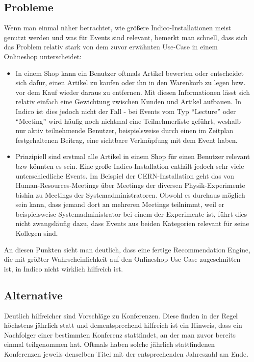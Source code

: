 \subsection{Probleme}

Wenn man einmal näher betrachtet, wie größere Indico-Installationen meist genutzt werden und was für
Events sind relevant, bemerkt man schnell, dass sich das Problem relativ stark von dem zuvor
erwähnten Use-Case in einem Onlineshop unterscheidet:

\begin{itemize}

\item In einem Shop kann ein Benutzer oftmals Artikel bewerten oder entscheidet sich dafür, einen
Artikel zu kaufen oder ihn in den Warenkorb zu legen bzw. vor dem Kauf wieder daraus zu entfernen.
Mit diesen Informationen lässt sich relativ einfach eine Gewichtung zwischen Kunden und Artikel
aufbauen. In Indico ist dies jedoch nicht der Fall - bei Events vom Typ \enquote{Lecture} oder
\enquote{Meeting} wird häufig noch nichtmal eine Teilnehmerliste geführt, weshalb nur aktiv
teilnehmende Benutzer, beispielsweise durch einen im Zeitplan festgehaltenen Beitrag, eine sichtbare
Verknüpfung mit dem Event haben.

\item Prinzipiell sind erstmal alle Artikel in einem Shop für einen Benutzer relevant bzw könnten es
sein. Eine große Indico-Installation enthält jedoch sehr viele unterschiedliche Events. Im Beispiel
der CERN-Installation geht das von Human-Resources-Meetings über Meetings der diversen
Physik-Experimente bishin zu Meetings der Systemadministratoren. Obwohl es durchaus möglich sein
kann, dass jemand dort an mehreren Meetings teilnimmt, weil er beispielsweise Systemadministrator
bei einem der Experimente ist, führt dies nicht zwangsläufig dazu, dass Events aus beiden Kategorien
relevant für seine Kollegen sind.

\end{itemize}

An diesen Punkten sieht man deutlich, dass eine fertige Recommendation Engine, die mit größter
Wahrscheinlichkeit auf den Onlineshop-Use-Case zugeschnitten ist, in Indico nicht wirklich hilfreich
ist.


\subsection{Alternative}

Deutlich hilfreicher sind Vorschläge zu Konferenzen. Diese finden in der Regel höchstens jährlich
statt und dementsprechend hilfreich ist ein Hinweis, dass ein Nachfolger einer bestimmten Konferenz
stattfindet, an der man zuvor bereits einmal teilgenommen hat. Oftmals haben solche jährlich
stattfindenen Konferenzen jeweils denselben Titel mit der entsprechenden Jahreszahl am Ende.

